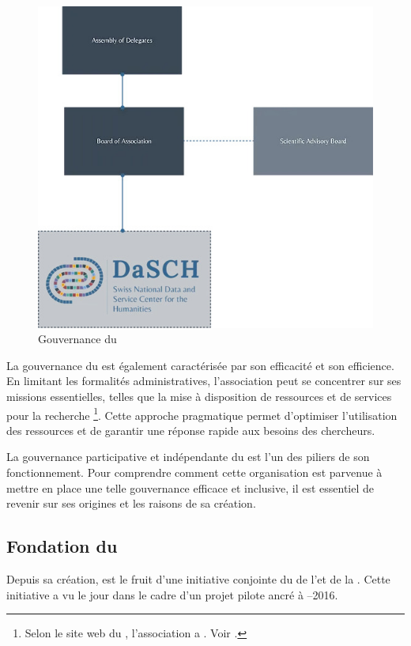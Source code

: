         \begin{figure}[h!]
            \centering
            \includegraphics[width=12cm]{02_images/part_01/03_board_association.jpg}
            \caption{Gouvernance du \dsc}
        \end{figure}

        La gouvernance du \dsc est également caractérisée par son efficacité et son efficience. En limitant les formalités administratives, l'association peut se concentrer sur ses missions essentielles, telles que la mise à disposition de ressources et de services pour la recherche \footnote{Selon le site web du \dsc, l'association a \fg. Voir \cite{gov_dasch}.}. Cette approche pragmatique permet d'optimiser l'utilisation des ressources et de garantir une réponse rapide aux besoins des chercheurs.

        La gouvernance participative et indépendante du \dsc est l'un des piliers de son fonctionnement. Pour comprendre comment cette organisation est parvenue à mettre en place une telle gouvernance efficace et inclusive, il est essentiel de revenir sur ses origines et les raisons de sa création.
    
        \subsection{Fondation du \dsc}
    
        Depuis sa création, \dsc est le fruit d'une initiative conjointe du \dhlab de l'\unibas et de la \sagw. Cette initiative a vu le jour dans le cadre d'un projet pilote ancré à –2016.
    
